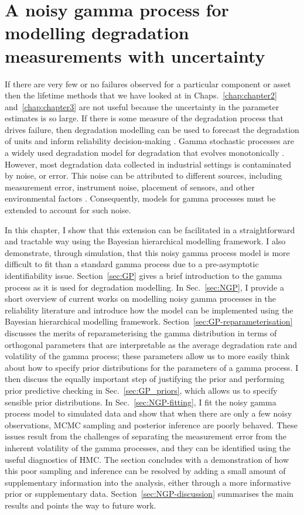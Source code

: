 \chapter{A noisy gamma process for modelling degradation measurements with uncertainty}\label{chap:chapter4}

If there are very few or no failures observed for a particular component or asset then the lifetime methods that we have looked at in Chaps.~\ref{chap:chapter2} and~\ref{chap:chapter3} are not useful because the uncertainty in the parameter estimates is so large. If there is some measure of the degradation process that drives failure, then degradation modelling can be used to forecast the degradation of units and inform reliability decision-making \citep{hamada_2008}. Gamma stochastic processes are a widely used degradation model for degradation that evolves monotonically \citep{lawless2004}. However, most degradation data collected in industrial settings is contaminated by noise, or error. This noise can be attributed to different sources, including measurement error, instrument noise, placement of sensors, and other environmental factors \citep{ye2015}. Consequently, models for gamma processes must be extended to account for such noise.

In this chapter, I show that this extension can be facilitated in a straightforward and tractable way using the Bayesian hierarchical modelling framework. I also demonstrate, through simulation, that this noisy gamma process model is more difficult to fit than a standard gamma process due to a pre-asymptotic identifiability issue. Section~\ref{sec:GP} gives a brief introduction to the gamma process as it is used for degradation modelling. In Sec.~\ref{sec:NGP}, I provide a short overview of current works on modelling noisy gamma processes in the reliability literature and introduce how the model can be implemented using the Bayesian hierarchical modelling framework. Section~\ref{sec:GP-reparameterisation} discusses the merits of reparameterising the gamma distribution in terms of orthogonal parameters that are interpretable as the average degradation rate and volatility of the gamma process; these parameters allow us to more easily think about how to specify prior distributions for the parameters of a gamma process. I then discuss the equally important step of justifying the prior and performing prior predictive checking in Sec.~\ref{sec:GP_priors}, which allows us to specify sensible prior distributions. In Sec.~\ref{sec:NGP-fitting}, I fit the noisy gamma process model to simulated data and show that when there are only a few noisy observations, MCMC sampling and posterior inference are poorly behaved. These issues result from the challenges of separating the measurement error from the inherent volatility of the gamma processes, and they can be identified using the useful diagnostics of HMC. The section concludes with a demonstration of how this poor sampling and inference can be resolved by adding a small amount of supplementary information into the analysis, either through a more informative prior or supplementary data. Section~\ref{sec:NGP-discussion} summarises the main results and points the way to future work.

